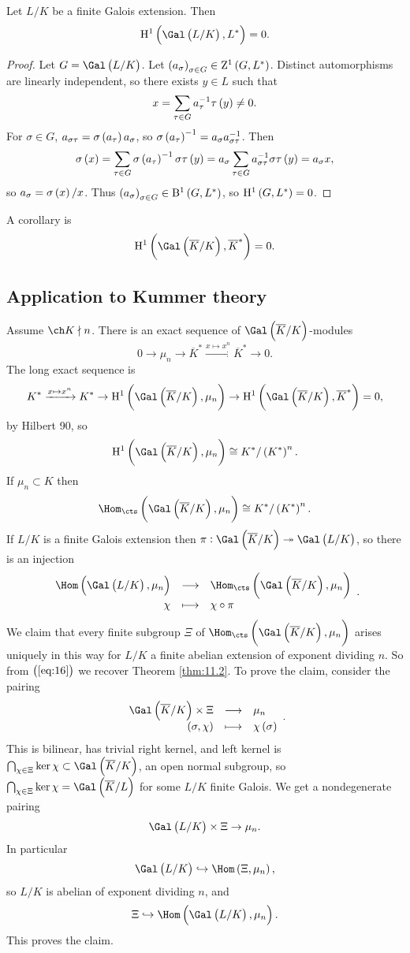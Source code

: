 \pagebreak

\begin{theorem*}
Let $ L / K $ be a finite Galois extension. Then
$$ \H^1\br{\Gal\br{L / K}, L^*} = 0. $$
\end{theorem*}

\begin{proof}
Let $ G = \Gal\br{L / K} $. Let $ \br{a_\sigma}_{\sigma \in G} \in \Z^1\br{G, L^*} $. Distinct automorphisms are linearly independent, so there exists $ y \in L $ such that
$$ x = \sum_{\tau \in G} a_\tau^{-1}\tau\br{y} \ne 0. $$
For $ \sigma \in G $, $ a_{\sigma\tau} = \sigma\br{a_\tau}a_\sigma $, so $ \sigma\br{a_\tau}^{-1} = a_\sigma a_{\sigma\tau}^{-1} $. Then
$$ \sigma\br{x} = \sum_{\tau \in G} \sigma\br{a_\tau}^{-1}\sigma\tau\br{y} = a_\sigma\sum_{\tau \in G} a_{\sigma\tau}^{-1}\sigma\tau\br{y} = a_\sigma x, $$
so $ a_\sigma = \sigma\br{x} / x $. Thus $ \br{a_\sigma}_{\sigma \in G} \in \B^1\br{G, L^*} $, so $ \H^1\br{G, L^*} = 0 $.
\end{proof}

A corollary is
$$ \H^1\br{\Gal\br{\overline{K} / K}, \overline{K}^*} = 0. $$

\subsection{Application to Kummer theory}

Assume $ \ch K \nmid n $. There is an exact sequence of $ \Gal\br{\overline{K} / K} $-modules
$$ 0 \to \mu_n \to \overline{K}^* \xrightarrow{x \mapsto x^n} \overline{K}^* \to 0. $$
The long exact sequence is
$$ K^* \xrightarrow{x \mapsto x^n} K^* \to \H^1\br{\Gal\br{\overline{K} / K}, \mu_n} \to \H^1\br{\Gal\br{\overline{K} / K}, \overline{K}^*} = 0, $$
by Hilbert 90, so
$$ \H^1\br{\Gal\br{\overline{K} / K}, \mu_n} \cong K^* / \br{K^*}^n. $$
If $ \mu_n \subset K $ then
\begin{equation}
\label{eq:16}
\Hom_{\cts}\br{\Gal\br{\overline{K} / K}, \mu_n} \cong K^* / \br{K^*}^n.
\end{equation}
If $ L / K $ is a finite Galois extension then $ \pi : \Gal\br{\overline{K} / K} \twoheadrightarrow \Gal\br{L / K} $, so there is an injection
$$ \function{\Hom\br{\Gal\br{L / K}, \mu_n}}{\Hom_{\cts}\br{\Gal\br{\overline{K} / K}, \mu_n}}{\chi}{\chi \circ \pi}. $$
We claim that every finite subgroup $ \Xi $ of $ \Hom_{\cts}\br{\Gal\br{\overline{K} / K}, \mu_n} $ arises uniquely in this way for $ L / K $ a finite abelian extension of exponent dividing $ n $. So from $ \br{\ref{eq:16}} $ we recover Theorem \ref{thm:11.2}. To prove the claim, consider the pairing
$$ \function{\Gal\br{\overline{K} / K} \times \Xi}{\mu_n}{\br{\sigma, \chi}}{\chi\br{\sigma}}. $$
This is bilinear, has trivial right kernel, and left kernel is $ \bigcap_{\chi \in \Xi} \ker \chi \subset \Gal\br{\overline{K} / K} $, an open normal subgroup, so $ \bigcap_{\chi \in \Xi} \ker \chi = \Gal\br{\overline{K} / L} $ for some $ L / K $ finite Galois. We get a nondegenerate pairing
$$ \Gal\br{L / K} \times \Xi \to \mu_n. $$
In particular
$$ \Gal\br{L / K} \hookrightarrow \Hom\br{\Xi, \mu_n}, $$
so $ L / K $ is abelian of exponent dividing $ n $, and
$$ \Xi \hookrightarrow \Hom\br{\Gal\br{L / K}, \mu_n}. $$
This proves the claim.

